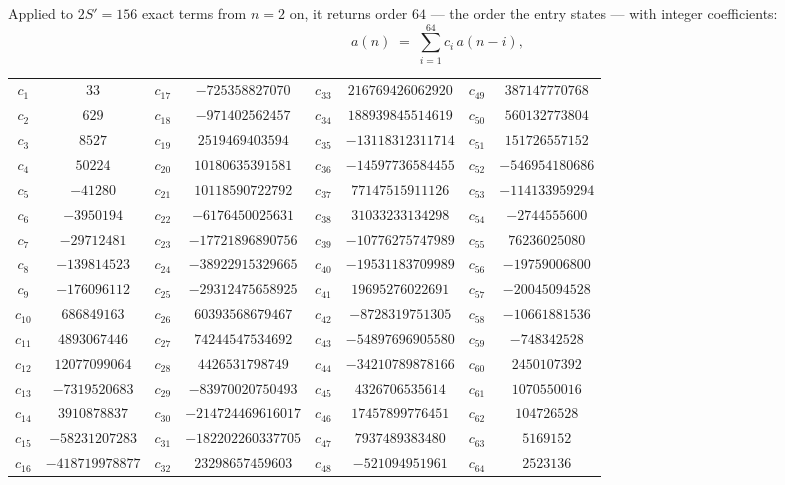 \documentclass[11pt,a4paper]{article}
\theoremstyle{plain}
\theoremstyle{definition}
\begin{document}
Applied to $2S'=156$ exact terms from $n=2$ on, it returns order $64$ --- the
order the entry states --- with integer coefficients:
\[
a(n)\;=\;\sum_{i=1}^{64}c_i\,a(n-i),
\]
\begin{center}\small
\begin{tabular}{cccccccc}
$c_{1}$ & $33$ & $c_{17}$ & $-725358827070$ & $c_{33}$ & $216769426062920$ & $c_{49}$ & $387147770768$ \\
$c_{2}$ & $629$ & $c_{18}$ & $-971402562457$ & $c_{34}$ & $188939845514619$ & $c_{50}$ & $560132773804$ \\
$c_{3}$ & $8527$ & $c_{19}$ & $2519469403594$ & $c_{35}$ & $-13118312311714$ & $c_{51}$ & $151726557152$ \\
$c_{4}$ & $50224$ & $c_{20}$ & $10180635391581$ & $c_{36}$ & $-14597736584455$ & $c_{52}$ & $-546954180686$ \\
$c_{5}$ & $-41280$ & $c_{21}$ & $10118590722792$ & $c_{37}$ & $77147515911126$ & $c_{53}$ & $-114133959294$ \\
$c_{6}$ & $-3950194$ & $c_{22}$ & $-6176450025631$ & $c_{38}$ & $31033233134298$ & $c_{54}$ & $-2744555600$ \\
$c_{7}$ & $-29712481$ & $c_{23}$ & $-17721896890756$ & $c_{39}$ & $-10776275747989$ & $c_{55}$ & $76236025080$ \\
$c_{8}$ & $-139814523$ & $c_{24}$ & $-38922915329665$ & $c_{40}$ & $-19531183709989$ & $c_{56}$ & $-19759006800$ \\
$c_{9}$ & $-176096112$ & $c_{25}$ & $-29312475658925$ & $c_{41}$ & $19695276022691$ & $c_{57}$ & $-20045094528$ \\
$c_{10}$ & $686849163$ & $c_{26}$ & $60393568679467$ & $c_{42}$ & $-8728319751305$ & $c_{58}$ & $-10661881536$ \\
$c_{11}$ & $4893067446$ & $c_{27}$ & $74244547534692$ & $c_{43}$ & $-54897696905580$ & $c_{59}$ & $-748342528$ \\
$c_{12}$ & $12077099064$ & $c_{28}$ & $4426531798749$ & $c_{44}$ & $-34210789878166$ & $c_{60}$ & $2450107392$ \\
$c_{13}$ & $-7319520683$ & $c_{29}$ & $-83970020750493$ & $c_{45}$ & $4326706535614$ & $c_{61}$ & $1070550016$ \\
$c_{14}$ & $3910878837$ & $c_{30}$ & $-214724469616017$ & $c_{46}$ & $17457899776451$ & $c_{62}$ & $104726528$ \\
$c_{15}$ & $-58231207283$ & $c_{31}$ & $-182202260337705$ & $c_{47}$ & $7937489383480$ & $c_{63}$ & $5169152$ \\
$c_{16}$ & $-418719978877$ & $c_{32}$ & $23298657459603$ & $c_{48}$ & $-521094951961$ & $c_{64}$ & $2523136$ \\
\end{tabular}
\end{center}
\end{document}
